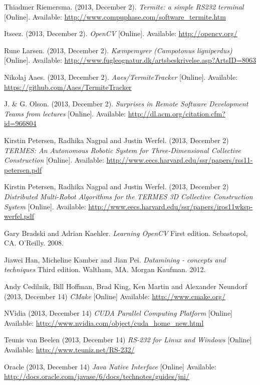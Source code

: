 \documentclass[oribibl]{llncs}
\begin{document}
\begin{thebibliography}{9}
    
		 Thiadmer Riemersma. (2013, December 2). \textit{Termite: a simple RS232 terminal} [Online]. Available: \url{http://www.compuphase.com/software_termite.htm}
        
         Itseez. (2013, December 2). \textit{OpenCV} [Online]. Available: \url{http://opencv.org/}
        
         Rune Larsen. (2013, December 2). \textit{Kæmpemyrer (Campotonus ligniperdus)} [Online]. Available: \url{http://www.fugleognatur.dk/artsbeskrivelse.asp?ArtsID=8063}
        
         Nikolaj Aaes. (2013, December 2). \textit{Aaes/TermiteTracker} [Online]. Available: \url{https://github.com/Aaes/TermiteTracker}
        
		 J. \& G. Olson. (2013, December 2). \textit{Surprises in Remote Software Development Teams from lectures} [Online]. Available: \url{http://dl.acm.org/citation.cfm?id=966804}
        
         Kirstin Petersen, Radhika Nagpal and Justin Werfel. (2013, December 2) \textit{TERMES: An Autonomous Robotic System for Three-Dimensional Collective Construction} [Online]. Available: \url{http://www.eecs.harvard.edu/ssr/papers/rss11-petersen.pdf}
        
         Kirstin Petersen, Radhika Nagpal and Justin Werfel. (2013, December 2) \textit{Distributed Multi-Robot Algorithms for the TERMES 3D Collective Construction System} [Online]. Available: \url{http://www.eecs.harvard.edu/ssr/papers/iros11wksp-werfel.pdf}
        
         Gary Bradski and Adrian Kaehler. \textit{Learning OpenCV} First edition. Sebastopol, CA. O'Reilly. 2008.
        
         Jiawei Han, Micheline Kamber and Jian Pei. \textit{Datamining - concepts and techniques} Third edition. Waltham, MA. Morgan Kaufman. 2012.
        
         Andy Cedilnik, Bill Hoffman, Brad King, Ken Martin and Alexander Neundorf (2013, December 14) \textit{CMake} [Online] Available: \url{http://www.cmake.org/}
        
         NVidia (2013, December 14) \textit{CUDA Parallel Computing Platform } [Online] Available: \url{http://www.nvidia.com/object/cuda_home_new.html}
        
         Teunis van Beelen (2013, December 14) \textit{RS-232 for Linux and Windows} [Online] Available: \url{http://www.teuniz.net/RS-232/}
        
         Oracle (2013, December 14) \textit{Java Native Interface} [Online] Available: \url{http://docs.oracle.com/javase/6/docs/technotes/guides/jni/}
        
\end{thebibliography}

%
\end{document}
